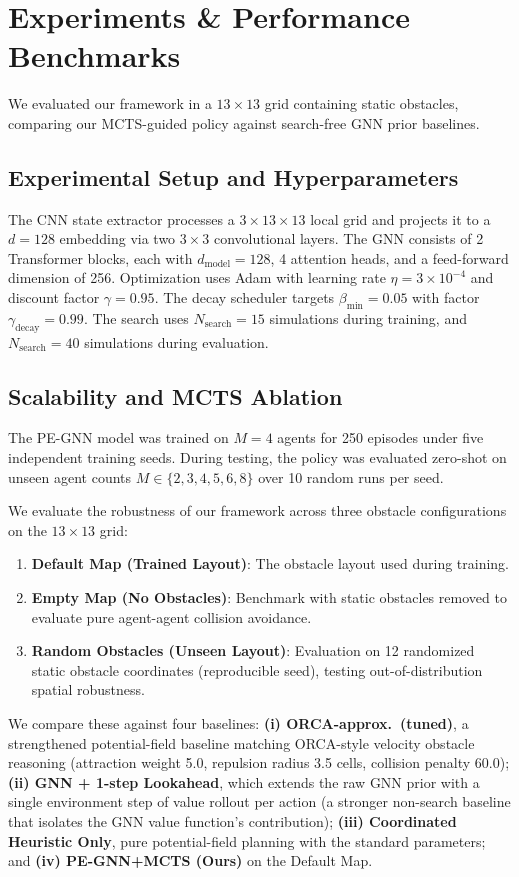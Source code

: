 \documentclass[11pt,a4paper]{article}
\begin{document}
\section{Experiments \& Performance Benchmarks}\label{sec:experiments}
We evaluated our framework in a $13 \times 13$ grid containing static obstacles, comparing our MCTS-guided policy against search-free GNN prior baselines.

\subsection{Experimental Setup and Hyperparameters}
The CNN state extractor processes a $3 \times 13 \times 13$ local grid and projects it to a $d=128$ embedding via two $3 \times 3$ convolutional layers. The GNN consists of 2 Transformer blocks, each with $d_{\mathrm{model}} = 128$, 4 attention heads, and a feed-forward dimension of 256. Optimization uses Adam with learning rate $\eta = 3 \times 10^{-4}$ and discount factor $\gamma = 0.95$. The decay scheduler targets $\beta_{\min} = 0.05$ with factor $\gamma_{\mathrm{decay}} = 0.99$. The search uses $N_{\mathrm{search}} = 15$ simulations during training, and $N_{\mathrm{search}} = 40$ simulations during evaluation.

\subsection{Scalability and MCTS Ablation}
The PE-GNN model was trained on $M=4$ agents for 250 episodes under five independent training seeds. During testing, the policy was evaluated zero-shot on unseen agent counts $M \in \{2, 3, 4, 5, 6, 8\}$ over 10 random runs per seed.

We evaluate the robustness of our framework across three obstacle configurations on the $13 \times 13$ grid:
\begin{enumerate}
    \item \textbf{Default Map (Trained Layout)}: The obstacle layout used during training.
    \item \textbf{Empty Map (No Obstacles)}: Benchmark with static obstacles removed to evaluate pure agent-agent collision avoidance.
    \item \textbf{Random Obstacles (Unseen Layout)}: Evaluation on 12 randomized static obstacle coordinates (reproducible seed), testing out-of-distribution spatial robustness.
\end{enumerate}
We compare these against four baselines: \textbf{(i) ORCA-approx.\ (tuned)}, a strengthened potential-field baseline matching ORCA-style velocity obstacle reasoning (attraction weight 5.0, repulsion radius 3.5 cells, collision penalty 60.0); \textbf{(ii) GNN + 1-step Lookahead}, which extends the raw GNN prior with a single environment step of value rollout per action (a stronger non-search baseline that isolates the GNN value function's contribution); \textbf{(iii) Coordinated Heuristic Only}, pure potential-field planning with the standard parameters; and \textbf{(iv) PE-GNN+MCTS (Ours)} on the Default Map.
\end{document}
